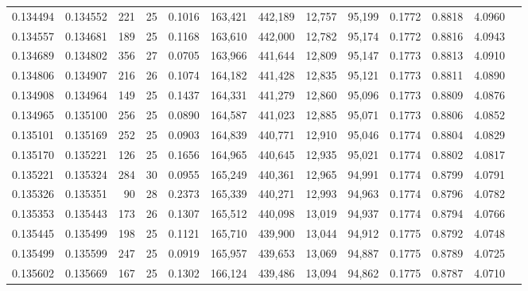 \begin{tabular}{rrrrrrrrrrrrr}
0.134494 & 0.134552 &   221 &  25 &                                     0.1016 & 163,421 & 442,189 &  12,757 &  95,199 & 0.1772 & 0.8818 & 4.0960 \\
0.134557 & 0.134681 &   189 &  25 &                                     0.1168 & 163,610 & 442,000 &  12,782 &  95,174 & 0.1772 & 0.8816 & 4.0943 \\
0.134689 & 0.134802 &   356 &  27 &                                     0.0705 & 163,966 & 441,644 &  12,809 &  95,147 & 0.1773 & 0.8813 & 4.0910 \\
0.134806 & 0.134907 &   216 &  26 &                                     0.1074 & 164,182 & 441,428 &  12,835 &  95,121 & 0.1773 & 0.8811 & 4.0890 \\
0.134908 & 0.134964 &   149 &  25 &                                     0.1437 & 164,331 & 441,279 &  12,860 &  95,096 & 0.1773 & 0.8809 & 4.0876 \\
0.134965 & 0.135100 &   256 &  25 &                                     0.0890 & 164,587 & 441,023 &  12,885 &  95,071 & 0.1773 & 0.8806 & 4.0852 \\
0.135101 & 0.135169 &   252 &  25 &                                     0.0903 & 164,839 & 440,771 &  12,910 &  95,046 & 0.1774 & 0.8804 & 4.0829 \\
0.135170 & 0.135221 &   126 &  25 &                                     0.1656 & 164,965 & 440,645 &  12,935 &  95,021 & 0.1774 & 0.8802 & 4.0817 \\
0.135221 & 0.135324 &   284 &  30 &                                     0.0955 & 165,249 & 440,361 &  12,965 &  94,991 & 0.1774 & 0.8799 & 4.0791 \\
0.135326 & 0.135351 &    90 &  28 &                                     0.2373 & 165,339 & 440,271 &  12,993 &  94,963 & 0.1774 & 0.8796 & 4.0782 \\
0.135353 & 0.135443 &   173 &  26 &                                     0.1307 & 165,512 & 440,098 &  13,019 &  94,937 & 0.1774 & 0.8794 & 4.0766 \\
0.135445 & 0.135499 &   198 &  25 &                                     0.1121 & 165,710 & 439,900 &  13,044 &  94,912 & 0.1775 & 0.8792 & 4.0748 \\
0.135499 & 0.135599 &   247 &  25 &                                     0.0919 & 165,957 & 439,653 &  13,069 &  94,887 & 0.1775 & 0.8789 & 4.0725 \\
0.135602 & 0.135669 &   167 &  25 &                                     0.1302 & 166,124 & 439,486 &  13,094 &  94,862 & 0.1775 & 0.8787 & 4.0710 \\

\end{tabular}
